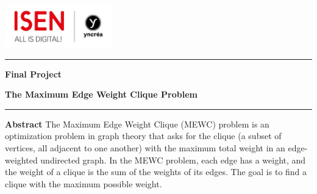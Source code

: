 
\begin{center}
    \includegraphics[width=0.35\textwidth]{image/ISEN.jpg}\\
\end{center}
    \rule{\linewidth}{0.5mm}
        
    \begin{center}
        {\Huge \bf Final Project}
    \end{center}
    
    \begin{center}
        {\LARGE \bf The Maximum Edge Weight Clique Problem}
    \end{center}
    \rule{\linewidth}{0.5mm}
    
    \vspace{1\baselineskip}
    
    \begin{center}
    \end{center}
    \vspace{1\baselineskip}   
    \large \textbf{Abstract} The Maximum Edge Weight Clique (MEWC) problem is an optimization problem in graph theory that asks for the clique (a subset of vertices, all adjacent to one another) with the maximum total weight in an edge-weighted undirected graph. In the MEWC problem, each edge has a weight, and the weight of a clique is the sum of the weights of its edges. The goal is to find a clique with the maximum possible weight. 

